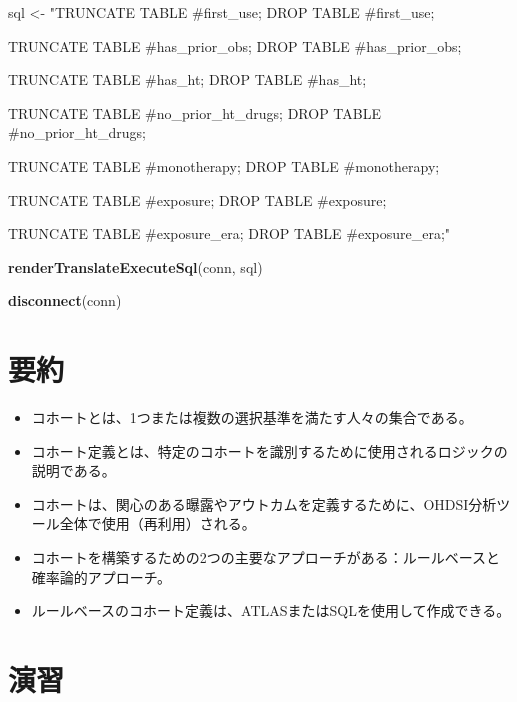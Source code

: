 \documentclass[
  11pt]{book}
\makeatletter
\newenvironment{Shaded}{\begin{snugshade}}{\end{snugshade}}
\newcommand{\FunctionTok}[1]{\textcolor[rgb]{0.13,0.29,0.53}{\textbf{#1}}}
\newcommand{\NormalTok}[1]{#1}
\newcommand{\OtherTok}[1]{\textcolor[rgb]{0.56,0.35,0.01}{#1}}
\newcommand{\StringTok}[1]{\textcolor[rgb]{0.31,0.60,0.02}{#1}}
\newenvironment{kframe}{%
\medskip{}
\setlength{\fboxsep}{.8em}
 \def\at@end@of@kframe{}%
 \ifinner\ifhmode%
  \def\at@end@of@kframe{\end{minipage}}%
  \begin{minipage}{\columnwidth}%
 \fi\fi%
 \def\FrameCommand##1{\hskip\@totalleftmargin \hskip-\fboxsep
 \colorbox{myShadeColor}{##1}\hskip-\fboxsep
     \hskip-\linewidth \hskip-\@totalleftmargin \hskip\columnwidth}%
 \MakeFramed {\advance\hsize-\width
   \@totalleftmargin\z@ \linewidth\hsize
   \@setminipage}}%
 {\par\unskip\endMakeFramed%
 \at@end@of@kframe}
\newenvironment{rmdblock}[1]
  {
  \begin{itemize}
  \renewcommand{\labelitemi}{
    \raisebox{-.7\height}[0pt][0pt]{
      {\setkeys{Gin}{width=3em,keepaspectratio}\texttt{[image: images/\#1]}}
    }
  }
  \setlength{\fboxsep}{1em}
  \begin{kframe}
  \item
  }
  {
  \end{kframe}
  \end{itemize}
  }
\newenvironment{rmdsummary}
  {\begin{rmdblock}{summary}}
  {\end{rmdblock}}
\theoremstyle{definition}
\theoremstyle{definition}
\theoremstyle{definition}
\theoremstyle{definition}
\theoremstyle{remark}
\makeatother
\begin{document}
\begin{Shaded}
\begin{Highlighting}[]
\NormalTok{sql }\OtherTok{\textless{}{-}} \StringTok{"TRUNCATE TABLE \#first\_use;}
\StringTok{DROP TABLE \#first\_use;}

\StringTok{TRUNCATE TABLE \#has\_prior\_obs;}
\StringTok{DROP TABLE \#has\_prior\_obs;}

\StringTok{TRUNCATE TABLE \#has\_ht;}
\StringTok{DROP TABLE \#has\_ht;}

\StringTok{TRUNCATE TABLE \#no\_prior\_ht\_drugs;}
\StringTok{DROP TABLE \#no\_prior\_ht\_drugs;}

\StringTok{TRUNCATE TABLE \#monotherapy;}
\StringTok{DROP TABLE \#monotherapy;}

\StringTok{TRUNCATE TABLE \#exposure;}
\StringTok{DROP TABLE \#exposure;}

\StringTok{TRUNCATE TABLE \#exposure\_era;}
\StringTok{DROP TABLE \#exposure\_era;"}

\FunctionTok{renderTranslateExecuteSql}\NormalTok{(conn, sql)}

\FunctionTok{disconnect}\NormalTok{(conn)}
\end{Highlighting}
\end{Shaded}

\section{要約}\label{ux8981ux7d04}

\begin{rmdsummary}
\begin{itemize}
\item
  コホートとは、1つまたは複数の選択基準を満たす人々の集合である。
\item
  コホート定義とは、特定のコホートを識別するために使用されるロジックの説明である。
\item
  コホートは、関心のある曝露やアウトカムを定義するために、OHDSI分析ツール全体で使用（再利用）される。
\item
  コホートを構築するための2つの主要なアプローチがある：ルールベースと確率論的アプローチ。
\item
  ルールベースのコホート定義は、ATLASまたはSQLを使用して作成できる。
\end{itemize}
\end{rmdsummary}

\section{演習}\label{ux6f14ux7fd2-5}
\end{document}
